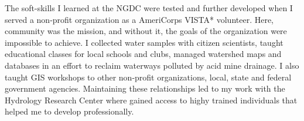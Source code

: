 \documentclass[12pt, letterpaper]{awesome-cv} %
\begin{document}
\begin{cvletter}
The soft-skills I learned at the NGDC were tested and further developed when I served a non‑profit organization as a AmeriCorps VISTA* volunteer. Here, community was the mission, and without it, the goals of the organization were impossible to achieve. I collected water samples with citizen scientists, taught educational classes for local schools and clubs, managed watershed maps and databases in an effort to reclaim waterways polluted by acid mine drainage. I also taught GIS workshops to other non‑profit organizations, local, state and federal government agencies. Maintaining these relationships led to my work %
with the Hydrology Research Center where %
gained access to highy trained individuals that helped me to develop professionally.%



\end{cvletter}
\end{document}
